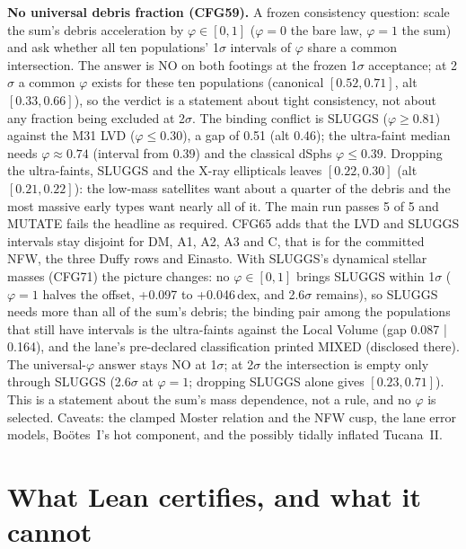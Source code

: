 \documentclass[10pt]{article}
\begin{document}
\textbf{No universal debris fraction (CFG59).} A frozen consistency question: scale the sum's debris acceleration by $\varphi\in[0,1]$ ($\varphi=0$ the bare law, $\varphi=1$ the sum) and ask whether all ten populations' 1$\sigma$ intervals of $\varphi$ share a common intersection. The answer is NO on both footings at the frozen 1$\sigma$ acceptance; at 2$\sigma$ a common $\varphi$ exists for these ten populations (canonical $[0.52,0.71]$, alt $[0.33,0.66]$), so the verdict is a statement about tight consistency, not about any fraction being excluded at 2$\sigma$. The binding conflict is SLUGGS ($\varphi\ge0.81$) against the M31 LVD ($\varphi\le0.30$), a gap of 0.51 (alt 0.46); the ultra-faint median needs $\varphi\approx0.74$ (interval from 0.39) and the classical dSphs $\varphi\le0.39$. Dropping the ultra-faints, SLUGGS and the X-ray ellipticals leaves $[0.22,0.30]$ (alt $[0.21,0.22]$): the low-mass satellites want about a quarter of the debris and the most massive early types want nearly all of it. The main run passes 5 of 5 and MUTATE fails the headline as required. CFG65 adds that the LVD and SLUGGS intervals stay disjoint for DM, A1, A2, A3 and C, that is for the committed NFW, the three Duffy rows and Einasto. With SLUGGS's dynamical stellar masses (CFG71) the picture changes: no $\varphi\in[0,1]$ brings SLUGGS within 1$\sigma$ ($\varphi=1$ halves the offset, +0.097 to +0.046\,dex, and 2.6$\sigma$ remains), so SLUGGS needs more than all of the sum's debris; the binding pair among the populations that still have intervals is the ultra-faints against the Local Volume (gap 0.087 | 0.164), and the lane's pre-declared classification printed MIXED (disclosed there). The universal-$\varphi$ answer stays NO at 1$\sigma$; at 2$\sigma$ the intersection is empty only through SLUGGS (2.6$\sigma$ at $\varphi=1$; dropping SLUGGS alone gives $[0.23,0.71]$). This is a statement about the sum's mass dependence, not a rule, and no $\varphi$ is selected. Caveats: the clamped Moster relation and the NFW cusp, the lane error models, Bo\"otes~I's hot component, and the possibly tidally inflated Tucana~II.

\section{What Lean certifies, and what it cannot}\label{sec:lean}
\end{document}
